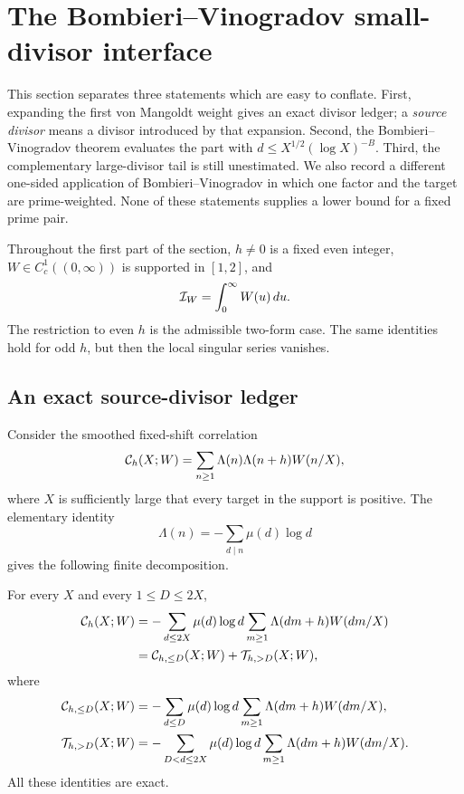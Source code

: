 \section{The Bombieri--Vinogradov small-divisor interface}
\label{sec:small-divisor-interface}

This section separates three statements which are easy to conflate.  First,
expanding the first von Mangoldt weight gives an exact divisor ledger; a
\emph{source divisor} means a divisor introduced by that expansion.  Second,
the Bombieri--Vinogradov theorem evaluates the part with
$d\le X^{1/2}(\log X)^{-B}$.  Third, the complementary large-divisor tail is
still unestimated.  We also record a different one-sided application
of Bombieri--Vinogradov in which one factor and the target are prime-weighted.
None of these statements supplies a lower bound for a fixed prime pair.

Throughout the first part of the section, $h\ne0$ is a fixed even integer,
$W\in C_c^1((0,\infty))$ is supported in $[1,2]$, and
\begin{equation}\label{eq:weight-mass}
 \mathcal I_W=\int_0^\infty W(u)\,du.
\end{equation}
The restriction to even $h$ is the admissible two-form case.  The same
identities hold for odd $h$, but then the local singular series vanishes.

\subsection{An exact source-divisor ledger}
\label{subsec:source-divisor-ledger}

Consider the smoothed fixed-shift correlation
\begin{equation}\label{eq:pair-correlation}
 \mathcal C_h(X;W)
 =\sum_{n\geq1}\Lambda(n)\Lambda(n+h)W(n/X),
\end{equation}
where $X$ is sufficiently large that every target in the support is positive.
The elementary identity
\begin{equation}\label{eq:mobius-log-source-identity}
 \Lambda(n)=-\sum_{d\mid n}\mu(d)\log d
\end{equation}
gives the following finite decomposition.

\begin{proposition}
\label{prop:exact-source-ledger}
For every $X$ and every $1\leq D\leq2X$,
\begin{align}
 \mathcal C_h(X;W)
 &=-\sum_{d\leq2X}\mu(d)\log d
     \sum_{m\geq1}\Lambda(dm+h)W(dm/X)
 \label{eq:exact-source-ledger}\\
 &=\mathcal C_{h,\leq D}(X;W)+\mathcal T_{h,>D}(X;W),
 \label{eq:exact-source-split}
\end{align}
where
\begin{align}
 \mathcal C_{h,\leq D}(X;W)
 &=-\sum_{d\leq D}\mu(d)\log d
     \sum_{m\geq1}\Lambda(dm+h)W(dm/X),
 \label{eq:short-source-ledger}\\
 \mathcal T_{h,>D}(X;W)
 &=-\sum_{D<d\leq2X}\mu(d)\log d
     \sum_{m\geq1}\Lambda(dm+h)W(dm/X).
 \label{eq:large-source-tail}
\end{align}
All these identities are exact.
\end{proposition}

